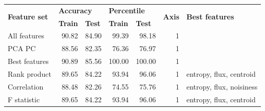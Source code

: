 \begin{table}[h]
\begin{tabular}{|l|rr|rr|r|l|}
\hline
\multirow{2}{*}{\textbf{Feature set}} & \multicolumn{2}{l|}{\textbf{Accuracy}}                                   & \multicolumn{2}{l|}{\textbf{Percentile}}                                 & \multicolumn{1}{l|}{\multirow{2}{*}{\textbf{Axis}}} & \multirow{2}{*}{\textbf{Best features}} \\ \cline{2-5}
                                      & \multicolumn{1}{l|}{\textbf{Train}} & \multicolumn{1}{l|}{\textbf{Test}} & \multicolumn{1}{l|}{\textbf{Train}} & \multicolumn{1}{l|}{\textbf{Test}} & \multicolumn{1}{l|}{}                               &                                         \\ \hline
All features                          & \multicolumn{1}{r|}{90.82}          & 84.90                              & \multicolumn{1}{r|}{99.39}          & 98.18                              & 1                                                   &                                         \\ \hline
PCA PC                                & \multicolumn{1}{r|}{88.56}          & 82.35                              & \multicolumn{1}{r|}{76.36}          & 76.97                              & 1                                                   &                                         \\ \hline
Best features                         & \multicolumn{1}{r|}{90.89}          & 85.56                              & \multicolumn{1}{r|}{100.00}         & 100.00                             & 1                                                   &                                         \\ \hline
Rank product                          & \multicolumn{1}{r|}{89.65}          & 84.22                              & \multicolumn{1}{r|}{93.94}          & 96.06                              & 1                                                   & entropy, flux, centroid                 \\ \hline
Correlation                           & \multicolumn{1}{r|}{88.48}          & 82.26                              & \multicolumn{1}{r|}{74.55}          & 75.76                              & 1                                                   & entropy, flux, noisiness                \\ \hline
F statistic                           & \multicolumn{1}{r|}{89.65}          & 84.22                              & \multicolumn{1}{r|}{93.94}          & 96.06                              & 1                                                   & entropy, flux, centroid                 \\ \hline

\end{tabular}
\end{table}
